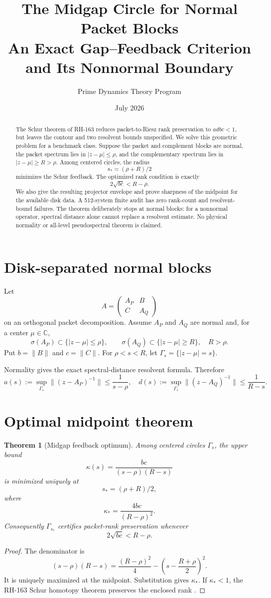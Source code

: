 \documentclass[12pt]{article}
\title{The Midgap Circle for Normal Packet Blocks\\\large An Exact Gap--Feedback Criterion and Its Nonnormal Boundary}
\author{Prime Dynamics Theory Program}
\date{July 2026}
\newtheorem{theorem}{Theorem}
\newcommand{\norm}[1]{\lVert#1\rVert}
\begin{document}
\maketitle
\begin{abstract}
The Schur theorem of RH-163 reduces packet-to-Riesz rank preservation to
$adbc<1$, but leaves the contour and two resolvent bounds unspecified.  We
solve this geometric problem for a benchmark class.  Suppose the packet and
complement blocks are normal, the packet spectrum lies in
$|z-\mu|\le\rho$, and the complementary spectrum lies in
$|z-\mu|\ge R>\rho$.  Among centered circles, the radius
\[
 s_*=(\rho+R)/2
\]
minimizes the Schur feedback.  The optimized rank condition is exactly
\[
 2\sqrt{bc}<R-\rho.
\]
We also give the resulting projector envelope and prove sharpness of the
midpoint for the available disk data.  A 512-system finite audit has zero
rank-count and resolvent-bound failures.  The theorem deliberately stops at
normal blocks: for a nonnormal operator, spectral distance alone cannot
replace a resolvent estimate.  No physical normality or all-level
pseudospectral theorem is claimed.
\end{abstract}

\section{Disk-separated normal blocks}
Let
\[
 A=\begin{pmatrix}A_P&B\\C&A_Q\end{pmatrix}
\]
on an orthogonal packet decomposition.  Assume $A_P$ and $A_Q$ are normal
and, for a center $\mu\in\mathbb C$,
\[
 \sigma(A_P)\subset\{|z-\mu|\le\rho\},\qquad
 \sigma(A_Q)\subset\{|z-\mu|\ge R\},\quad R>\rho.
\]
Put $b=\norm B$ and $c=\norm C$.  For $\rho<s<R$, let
$\Gamma_s=\{|z-\mu|=s\}$.

Normality gives the exact spectral-distance resolvent formula.  Therefore
\[
 a(s):=\sup_{\Gamma_s}\norm{(z-A_P)^{-1}}\le\frac1{s-\rho},
\quad
 d(s):=\sup_{\Gamma_s}\norm{(z-A_Q)^{-1}}\le\frac1{R-s}.
\]

\section{Optimal midpoint theorem}
\begin{theorem}[Midgap feedback optimum]\label{thm:midgap}
Among centered circles $\Gamma_s$, the upper bound
\[
 \kappa(s)=\frac{bc}{(s-\rho)(R-s)}
\]
is minimized uniquely at
\[
 s_*=(\rho+R)/2,
\]
where
\[
 \kappa_* = \frac{4bc}{(R-\rho)^2}.
\]
Consequently $\Gamma_{s_*}$ certifies packet-rank preservation whenever
\[
 \boxed{\ 2\sqrt{bc}<R-\rho.\ }
\]
\end{theorem}
\begin{proof}
The denominator is
\[
 (s-\rho)(R-s)
 =\frac{(R-\rho)^2}{4}
  -\left(s-\frac{R+\rho}{2}\right)^2.
\]
It is uniquely maximized at the midpoint.  Substitution gives $\kappa_*$.
If $\kappa_*<1$, the RH-163 Schur homotopy theorem preserves the enclosed
rank \citep{WangRH163}.
\end{proof}
\end{document}
